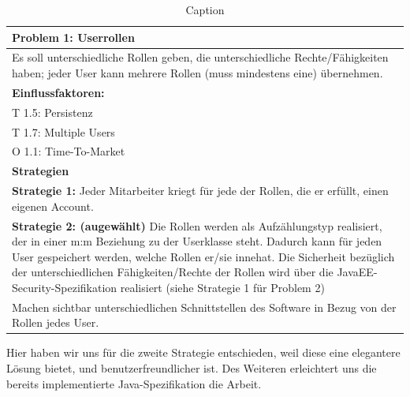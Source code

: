 \documentclass[enabledeprecatedfontcommands,fontsize=12pt,paper=a4,twoside]{scrartcl}
\begin{document}
\begin{table}[]
    \centering
    \begin{tabular}{|p{15cm}|}
    \hline
          \textbf{Problem 1:} Userrollen \\ \hline
          Es soll unterschiedliche Rollen geben, die unterschiedliche Rechte/Fähigkeiten haben; jeder User kann mehrere Rollen (muss mindestens eine) übernehmen. \\ \hline
          \textbf{Einflussfaktoren: } \\
          T 1.5: Persistenz \\
          T 1.7: Multiple Users\\
          O 1.1: Time-To-Market \\
          \hline
          \textbf{Strategien} \\ \hline
          \textbf{Strategie 1:} Jeder Mitarbeiter kriegt für jede der Rollen, die er erfüllt, einen eigenen Account. \\
          \textbf{Strategie 2: (augewählt)} Die Rollen werden als Aufzählungstyp realisiert, der in einer m:m Beziehung zu der Userklasse steht. Dadurch kann für jeden User gespeichert werden, welche Rollen er/sie innehat. Die Sicherheit bezüglich der unterschiedlichen Fähigkeiten/Rechte der Rollen wird über die JavaEE-Security-Spezifikation realisiert (siehe Strategie 1 für Problem 2)\\
          Machen sichtbar unterschiedlichen Schnittstellen des Software in Bezug von der Rollen jedes User. \\ \hline
    \end{tabular}

    \caption{Caption}
    \label{tab:my_label}
\end{table}

Hier haben wir uns für die zweite Strategie entschieden, weil diese eine elegantere Lösung bietet, und benutzerfreundlicher ist. Des Weiteren erleichtert uns die bereits implementierte Java-Spezifikation die Arbeit. \\
\end{document}
